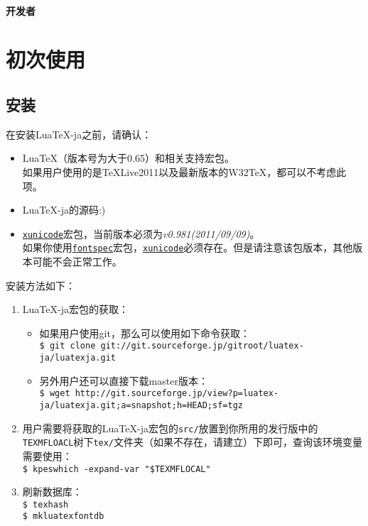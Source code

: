 \documentclass{ltjarticle}
\def\LuaTeX{Lua\TeX}
\begin{document}
\paragraph{开发者}
\begin{multienumerate}
\def\labelenumi{$\bullet$}
\end{multienumerate}
\section{初次使用}
\subsection{安装}
在安装\LuaTeX-ja之前，请确认：
\begin{itemize}
\item \LuaTeX（版本号为大于0.65）和相关支持宏包。\\
如果用户使用的是\TeX Live2011以及最新版本的W32\TeX，都可以不考虑此项。
\item \LuaTeX-ja的源码:)
\item \underline{\texttt{xunicode}}宏包，当前版本必须为\textit{v0.981(2011/09/09)}。\\
如果你使用\underline{\texttt{fontspec}}宏包，\underline{\texttt{xunicode}}必须存在。但是请注意该包版本，其他版本可能不会正常工作。
\end{itemize}
安装方法如下：
\begin{enumerate}
\item \LuaTeX-ja宏包的获取：
	\begin{itemize}
	\item 如果用户使用git，那么可以使用如下命令获取：\\
		\verb!$ git clone git://git.sourceforge.jp/gitroot/luatex-ja/luatexja.git!
	\item 另外用户还可以直接下载master版本：\\
		\verb!$ wget http://git.sourceforge.jp/view?p=luatex-ja/luatexja.git;a=snapshot;h=HEAD;sf=tgz!
	\end{itemize}
\item 用户需要将获取的\LuaTeX-ja宏包的\verb!src/!放置到你所用的发行版中的\verb!TEXMFLOACL!树下\verb!tex/!文件夹（如果不存在，请建立）下即可，查询该环境变量需要使用：\\
	\verb!$ kpeswhich -expand-var "$TEXMFLOCAL"!
\item 刷新数据库：\\
	\verb!$ texhash!\\
	\verb!$ mkluatexfontdb!
\end{enumerate}
\end{document}
